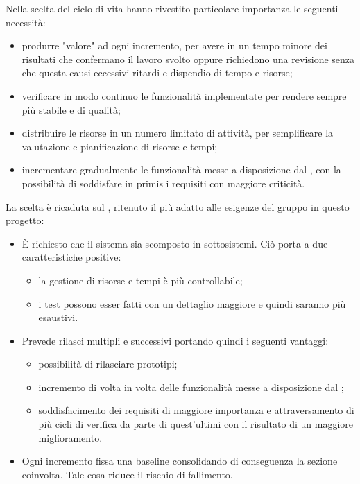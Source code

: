 		Nella scelta del ciclo di vita hanno rivestito particolare importanza le seguenti necessità:
		\begin{itemize}
			\item produrre "valore" ad ogni incremento, per avere in un tempo minore dei risultati che confermano il lavoro svolto oppure richiedono una revisione senza che questa causi eccessivi ritardi e dispendio di tempo e risorse;
			\item verificare in modo continuo le funzionalità implementate per rendere  sempre più stabile e di qualità;
			\item distribuire le risorse in un numero limitato di attività, per semplificare la valutazione e pianificazione di risorse e tempi;
			\item incrementare gradualmente le funzionalità messe a disposizione dal , con la possibilità di soddisfare in primis i requisiti con maggiore criticità.\\
		\end{itemize}
		
		La scelta è ricaduta sul \underline{}, ritenuto il più adatto alle esigenze del gruppo in questo progetto:
		\begin{itemize}
			\item È richiesto che il sistema sia scomposto in sottosistemi. Ciò porta a due caratteristiche positive:
			\begin{itemize}
				\item la gestione di risorse e tempi è più controllabile;
				\item i test possono esser fatti con un dettaglio maggiore e quindi saranno più esaustivi.
			\end{itemize}
			\item Prevede rilasci multipli e successivi portando quindi i seguenti vantaggi:
			\begin{itemize}
				\item possibilità di rilasciare prototipi;
				\item incremento di volta in volta delle funzionalità messe a disposizione dal ;
				\item soddisfacimento dei requisiti di maggiore importanza e attraversamento di più cicli di verifica da parte di quest'ultimi con il risultato di un maggiore miglioramento.
			\end{itemize}
			\item Ogni incremento fissa una baseline consolidando di conseguenza la sezione coinvolta. Tale cosa riduce il rischio di fallimento.
		\end{itemize}
